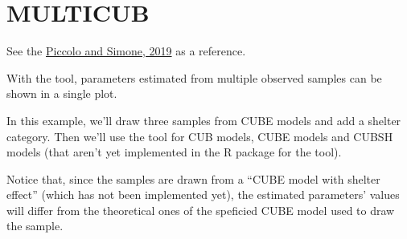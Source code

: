 \documentclass[letterpaper,10pt,english]{sphinxmanual}
\begin{document}
\section{MULTICUB}
\label{\detokenize{manual:multicub}}\label{\detokenize{manual:multicub-manual}}
\sphinxAtStartPar
See the \hyperlink{cite.references:id3}{Piccolo and Simone, 2019} as a reference.

\sphinxAtStartPar
{}

\sphinxAtStartPar
With the  tool, parameters estimated from
multiple observed samples can be shown in a single plot.

\sphinxAtStartPar
In this example, we’ll draw three samples from CUBE
models and  add a shelter category. Then we’ll
use the  tool for CUB models, CUBE models and
CUBSH models (that aren’t yet implemented in the R package 
for the  tool).

\sphinxAtStartPar
Notice that, since the samples are drawn from a “CUBE model with shelter effect”
(which has not been implemented yet), the estimated parameters’ values will
differ from the theoretical ones of the speficied CUBE model used to draw the sample.
\end{document}
